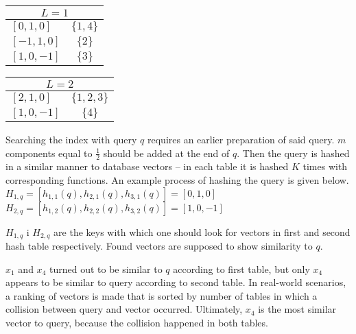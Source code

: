 \begin{center}
\begin{tabular}{|l|c|}
\hline
\multicolumn{2}{|c|}{$L = 1$} \\
\hline
$[0, 1, 0]$ & $\{1, 4\}$ \\
\hline
$[-1, 1, 0]$ & $\{2\}$ \\
\hline
$[1, 0, -1]$ & $\{3\}$ \\
\hline
\end{tabular}
\begin{tabular}{|l|c|}
\hline
\multicolumn{2}{|c|}{$L = 2$} \\
\hline
$[2, 1, 0]$ & $\{1, 2, 3\}$ \\
\hline
$[1, 0, -1]$ & $\{4\}$ \\
\hline
\end{tabular}
\end{center}
Searching the index with query $q$ requires an earlier preparation of said query.
$m$ components equal to $\frac{1}{2}$ should be added at the end of $q$.
Then the query is hashed in a similar manner to database vectors -- in each table it is hashed $K$ times with corresponding functions.
An example process of hashing the query is given below.\\
$H_{1,q} = [h_{1,1}(q), h_{2,1}(q), h_{3,1}(q)] = [0, 1, 0]$\\
$H_{2,q} = [h_{1,2}(q), h_{2,2}(q), h_{3,2}(q)] = [1, 0, -1]$

$H_{1,q}$ i $H_{2,q}$ are the keys with which one should look for vectors in first and second hash table respectively.
Found vectors are supposed to show similarity to $q$.
\par
$x_1$ and $x_4$ turned out to be similar to $q$ according to first table, but only $x_4$ appears to be similar to query according to second table.
In real-world scenarios, a ranking of vectors is made that is sorted by number of tables in which a collision between query and vector occurred.
Ultimately, $x_4$ is the most similar vector to query, because the collision happened in both tables.

